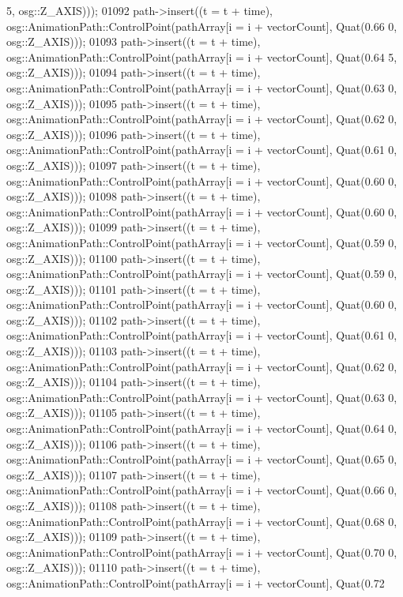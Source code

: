\begin{DoxyCode}
      5, osg::Z\_AXIS)));
01092     path->insert((t = t + time), osg::AnimationPath::ControlPoint(pathArray[i = i + vectorCount], Quat(0.66
      0, osg::Z\_AXIS)));
01093     path->insert((t = t + time), osg::AnimationPath::ControlPoint(pathArray[i = i + vectorCount], Quat(0.64
      5, osg::Z\_AXIS)));
01094     path->insert((t = t + time), osg::AnimationPath::ControlPoint(pathArray[i = i + vectorCount], Quat(0.63
      0, osg::Z\_AXIS)));
01095     path->insert((t = t + time), osg::AnimationPath::ControlPoint(pathArray[i = i + vectorCount], Quat(0.62
      0, osg::Z\_AXIS)));
01096     path->insert((t = t + time), osg::AnimationPath::ControlPoint(pathArray[i = i + vectorCount], Quat(0.61
      0, osg::Z\_AXIS)));
01097     path->insert((t = t + time), osg::AnimationPath::ControlPoint(pathArray[i = i + vectorCount], Quat(0.60
      0, osg::Z\_AXIS)));
01098     path->insert((t = t + time), osg::AnimationPath::ControlPoint(pathArray[i = i + vectorCount], Quat(0.60
      0, osg::Z\_AXIS)));
01099     path->insert((t = t + time), osg::AnimationPath::ControlPoint(pathArray[i = i + vectorCount], Quat(0.59
      0, osg::Z\_AXIS)));
01100     path->insert((t = t + time), osg::AnimationPath::ControlPoint(pathArray[i = i + vectorCount], Quat(0.59
      0, osg::Z\_AXIS)));
01101     path->insert((t = t + time), osg::AnimationPath::ControlPoint(pathArray[i = i + vectorCount], Quat(0.60
      0, osg::Z\_AXIS)));
01102     path->insert((t = t + time), osg::AnimationPath::ControlPoint(pathArray[i = i + vectorCount], Quat(0.61
      0, osg::Z\_AXIS)));
01103     path->insert((t = t + time), osg::AnimationPath::ControlPoint(pathArray[i = i + vectorCount], Quat(0.62
      0, osg::Z\_AXIS)));
01104     path->insert((t = t + time), osg::AnimationPath::ControlPoint(pathArray[i = i + vectorCount], Quat(0.63
      0, osg::Z\_AXIS)));
01105     path->insert((t = t + time), osg::AnimationPath::ControlPoint(pathArray[i = i + vectorCount], Quat(0.64
      0, osg::Z\_AXIS)));
01106     path->insert((t = t + time), osg::AnimationPath::ControlPoint(pathArray[i = i + vectorCount], Quat(0.65
      0, osg::Z\_AXIS)));
01107     path->insert((t = t + time), osg::AnimationPath::ControlPoint(pathArray[i = i + vectorCount], Quat(0.66
      0, osg::Z\_AXIS)));
01108     path->insert((t = t + time), osg::AnimationPath::ControlPoint(pathArray[i = i + vectorCount], Quat(0.68
      0, osg::Z\_AXIS)));
01109     path->insert((t = t + time), osg::AnimationPath::ControlPoint(pathArray[i = i + vectorCount], Quat(0.70
      0, osg::Z\_AXIS)));
01110     path->insert((t = t + time), osg::AnimationPath::ControlPoint(pathArray[i = i + vectorCount], Quat(0.72

\end{DoxyCode}
